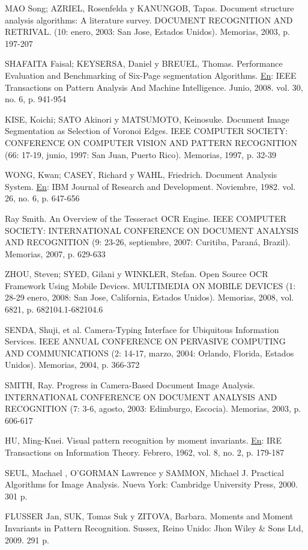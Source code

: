 \documentclass[a4paper, 12pt, oneside]{article}
\begin{document}
	MAO Song; AZRIEL, Rosenfelda y KANUNGOB, Tapas. Document structure analysis algorithms: A literature survey. DOCUMENT RECOGNITION AND RETRIVAL. (10: enero, 2003: San Jose, Estados Unidos). Memorias, 2003, p. 197-207
	
	SHAFAITA Faisal; KEYSERSA, Daniel y BREUEL, Thomas. Performance Evaluation and Benchmarking of Six-Page segmentation Algorithms. \underline{En}: IEEE Transactions on Pattern Analysis And Machine Intelligence. Junio, 2008. vol. 30, no. 6, p. 941-954
	
	KISE, Koichi; SATO Akinori y MATSUMOTO, Keinosuke. Document Image Segmentation as Selection of Voronoi Edges. IEEE COMPUTER SOCIETY: CONFERENCE ON COMPUTER VISION AND PATTERN RECOGNITION (66: 17-19, junio, 1997: San Juan, Puerto Rico). Memorias, 1997, p. 32-39
	
	WONG, Kwan; CASEY, Richard y WAHL, Friedrich. Document Analysis System. \underline{En}: IBM Journal of Research and Development. Noviembre, 1982. vol. 26, no. 6, p. 647-656
	
	Ray Smith. An Overview of the Tesseract OCR Engine. IEEE COMPUTER SOCIETY: INTERNATIONAL CONFERENCE ON DOCUMENT ANALYSIS AND RECOGNITION (9: 23-26, septiembre, 2007: Curitiba, Paraná, Brazil). Memorias, 2007, p. 629-633
	
	ZHOU, Steven; SYED, Gilani y WINKLER, Stefan. Open Source OCR Framework Using Mobile Devices. MULTIMEDIA ON MOBILE DEVICES (1: 28-29 enero, 2008: San Jose, California, Estados Unidos). Memorias, 2008, vol. 6821, p. 682104.1-682104.6
	
	SENDA, Shuji, et al. Camera-Typing Interface for Ubiquitous Information Services. IEEE ANNUAL CONFERENCE ON PERVASIVE COMPUTING AND COMMUNICATIONS (2: 14-17, marzo, 2004: Orlando, Florida, Estados Unidos). Memorias, 2004, p. 366-372
	
	SMITH, Ray. Progress in Camera-Based Document Image Analysis. INTERNATIONAL CONFERENCE ON DOCUMENT ANALYSIS AND RECOGNITION (7: 3-6, agosto, 2003: Edimburgo, Escocia). Memorias, 2003, p. 606-617
	
	HU, Ming-Kuei. Visual pattern recognition by moment invariants. \underline{En}: IRE Transactions on Information Theory. Febrero, 1962, vol. 8, no. 2, p. 179-187
	
	SEUL, Machael , O'GORMAN Lawrence y SAMMON, Michael J. Practical Algorithms for Image Analysis. Nueva York: Cambridge University Press, 2000. 301 p.
	
	FLUSSER Jan, SUK, Tomas Suk y ZITOVA, Barbara. Moments and Moment Invariants in Pattern Recognition. Sussex, Reino Unido: Jhon Wiley \& Sons Ltd, 2009. 291 p.
	
\end{document}
